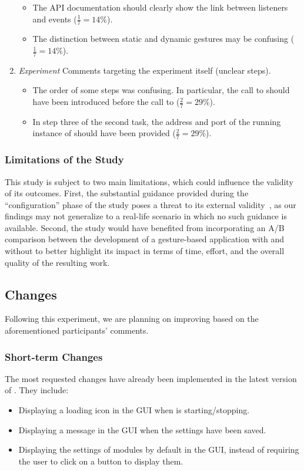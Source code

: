 \begin{enumerate}[noitemsep]
\begin{itemize}[noitemsep]
        \item The API documentation should clearly show the link between listeners and events ($\frac{1}{7}{=}14\%$).
        \item The distinction between static and dynamic gestures may be confusing ($\frac{1}{7}{=}14\%$).
    \end{itemize}
    \item \textit{Experiment} Comments targeting the experiment itself (\eg unclear steps).
    \begin{itemize}[noitemsep]
        \item The order of some steps was confusing. In particular, the call to  should have been introduced before the call to  ($\frac{2}{7}{=}29\%$). 
        \item In step three of the second task, the address and port of the running instance of \ql should have been provided ($\frac{2}{7}{=}29\%$). 
    \end{itemize}
\end{enumerate}

\subsubsection{Limitations of the Study}
This study is subject to two main limitations, which could influence the validity of its outcomes.
%
First, the substantial guidance provided during the ``configuration'' phase of the study poses a threat to its external validity~\cite{Feldt:2010}, as our findings may not generalize to a real-life scenario in which no such guidance is available. 
%
Second, the study would have benefited from incorporating an A/B comparison between the development of a gesture-based application with and without \ql to better highlight its impact in terms of time, effort, and the overall quality of the resulting work.

\subsection{Changes} \label{sec:quantumleap:evaluation:changes}
Following this experiment, we are planning on improving \ql based on the aforementioned participants' comments.

\subsubsection{Short-term Changes} The most requested changes have already been implemented in the latest version of \ql. They include:
\begin{itemize}
    \item Displaying a loading icon in the GUI when \ql is starting\slash stopping.
    \item Displaying a message in the GUI when the settings have been saved.
    \item Displaying the settings of modules by default in the GUI, instead of requiring the user to click on a button to display them.
\end{itemize}

